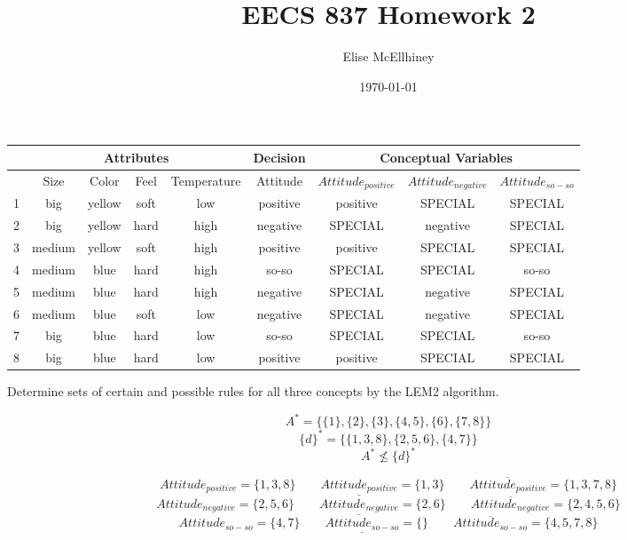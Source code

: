 \documentclass[10pt]{amsart}
\title{EECS 837 Homework 2}
\author{Elise McEllhiney}
\date{\today}                                           %
\begin{document}
\maketitle

\begin{center}
\begin{tabular}{ | c | c | c | c | c | c | c | c | c |}
\hline
 & \multicolumn{4}{|c|}{Attributes} & Decision & \multicolumn{3}{|c|}{Conceptual Variables} \\
 \hline
 & Size & Color & Feel & Temperature & Attitude & $Attitude_{positive}$ & $Attitude_{negative}$ & $Attitude_{so-so}$ \\
 \hline
 1 & big & yellow & soft & low & positive & positive & SPECIAL & SPECIAL \\ 
 2 & big & yellow & hard & high & negative & SPECIAL & negative & SPECIAL\\  
 3 & medium & yellow & soft & high & positive & positive & SPECIAL & SPECIAL\\  
 4 & medium & blue & hard & high & so-so & SPECIAL & SPECIAL & so-so\\ 
 5 & medium & blue & hard & high & negative & SPECIAL & negative & SPECIAL\\ 
 6 & medium & blue & soft & low & negative & SPECIAL & negative & SPECIAL \\ 
 7 & big & blue & hard & low & so-so & SPECIAL & SPECIAL & so-so \\
 8 & big & blue & hard & low & positive & positive & SPECIAL & SPECIAL \\
 \hline 
\end{tabular}
\end{center}

Determine sets of certain and possible rules for all three concepts by the LEM2 algorithm.

$$A^* = \{  \{ 1 \}, \{ 2 \}, \{ 3 \}, \{ 4, 5 \}, \{ 6 \}, \{ 7, 8 \} \}$$
$$\{ d \}^* = \{  \{ 1, 3, 8 \}, \{ 2, 5, 6 \}, \{ 4, 7 \} \}$$
$$A^* \nleq \{d\}^*$$

$$Attitude_{positive} = \{1,3,8\} \qquad \underline{Attitude_{positive}} = \{ 1,3 \} \qquad \overline{Attitude_{positive}} = \{ 1,3,7,8 \}$$
$$Attitude_{negative} = \{2,5,6\} \qquad \underline{Attitude_{negative}} = \{ 2,6 \} \qquad \overline{Attitude_{negative}} = \{ 2,4,5,6 \}$$
$$Attitude_{so-so} = \{4,7\} \qquad \underline{Attitude_{so-so}} = \{  \} \qquad \overline{Attitude_{so-so}} = \{ 4,5,7,8 \}$$
\end{document}
